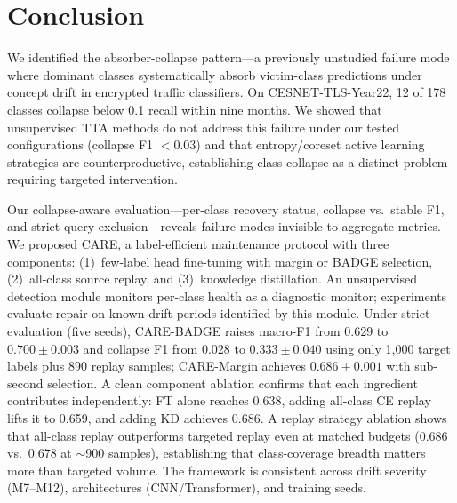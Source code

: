 \documentclass[journal]{IEEEtran}
\newcommand{\ours}{CARE}  %
\begin{document}
\section{Conclusion}
\label{sec:conclusion}

We identified the absorber-collapse pattern---a previously unstudied failure mode where dominant classes systematically absorb victim-class predictions under concept drift in encrypted traffic classifiers.
On CESNET-TLS-Year22, 12 of 178 classes collapse below 0.1 recall within nine months.
We showed that unsupervised TTA methods do not address this failure under our tested configurations (collapse F1 ${<}0.03$) and that entropy/coreset active learning strategies are counterproductive, establishing class collapse as a distinct problem requiring targeted intervention.

Our collapse-aware evaluation---per-class recovery status, collapse vs.\ stable F1, and strict query exclusion---reveals failure modes invisible to aggregate metrics.
We proposed \ours{}, a label-efficient maintenance protocol with three components: (1)~few-label head fine-tuning with margin or BADGE selection, (2)~all-class source replay, and (3)~knowledge distillation.
An unsupervised detection module monitors per-class health as a diagnostic monitor; experiments evaluate repair on known drift periods identified by this module.
Under strict evaluation (five seeds), \ours{}-BADGE raises macro-F1 from 0.629 to $0.700{\pm}0.003$ and collapse F1 from 0.028 to $0.333{\pm}0.040$ using only 1{,}000 target labels plus 890 replay samples; \ours{}-Margin achieves $0.686{\pm}0.001$ with sub-second selection.
A clean component ablation confirms that each ingredient contributes independently: FT alone reaches 0.638, adding all-class CE replay lifts it to 0.659, and adding KD achieves 0.686.
A replay strategy ablation shows that all-class replay outperforms targeted replay even at matched budgets (0.686 vs.\ 0.678 at ${\sim}$900 samples), establishing that class-coverage breadth matters more than targeted volume.
The framework is consistent across drift severity (M7--M12), architectures (CNN/Transformer), and training seeds.



\end{document}
